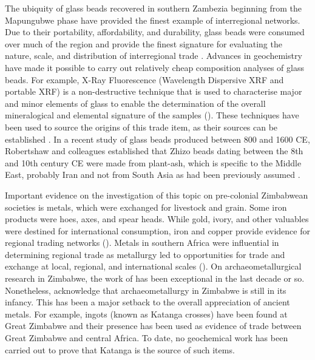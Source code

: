 The ubiquity of glass beads recovered in southern Zambezia beginning from the Mapungubwe phase have provided the finest example of interregional networks.  Due to their portability, affordability, and durability, glass beads were consumed over much of the region and provide the finest signature for evaluating the nature, scale, and distribution of interregional trade \parencite{dussubieux2008}.  Advances in geochemistry have made it possible to carry out relatively cheap composition analyses of glass beads.  For example, X-Ray Fluorescence (Wavelength Dispersive XRF and portable XRF) is a non-destructive technique that is used to characterise major and minor elements of glass to enable the determination of the overall mineralogical and elemental signature of the samples (\cite[][245]{pernicka2014}). These techniques have been used to source the origins of this trade item, as their sources can be established \parencite{wood2000}. In a recent study of glass beads produced between 800 and 1600 CE, Robertshaw and colleagues established that Zhizo beads dating between the 8th and 10th century CE were made from plant-ash, which is specific to the Middle East, probably Iran and not from South Asia as had been previously assumed \parencite{robertshaw2010}.

Important evidence on the investigation of this topic on pre-colonial Zimbabwean societies is metals, which were exchanged for livestock and grain. Some iron products were hoes, axes, and spear heads. While gold, ivory, and other valuables were destined for international consumption, iron and copper provide evidence for regional trading networks (\cite[13]{pikirayi2017}). Metals in southern Africa were influential in determining regional trade as metallurgy led to opportunities for trade and exchange at local, regional, and international scales (\cites{chirikure2007}{chirikure2013post}). On archaeometallurgical research in Zimbabwe, the work of
\citeauthor{chirikure2005}
has been exceptional in the last decade or so. Nonetheless, \textcite[][152]{chirikure2013post} acknowledge that archaeometallurgy in Zimbabwe is still in its infancy. This has been a major setback to the overall appreciation of ancient metals.
For example, ingots (known as Katanga crosses) have been found at Great Zimbabwe and their presence has been used as evidence of trade between Great Zimbabwe and central Africa. To date, no geochemical work has been carried out to prove that Katanga is the source of such items.

